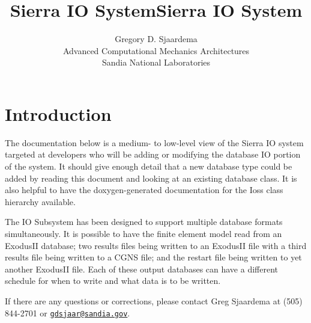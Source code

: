 \documentclass[11pt,twoside]{article}
\title{Sierra IO System}
\begin{document}
\clearpage\pagestyle{Standard}
\title{Sierra IO System}
\author{Gregory D. Sjaardema\\
	Advanced Computational Mechanics Architectures\\
	Sandia National Laboratories}

\maketitle

\setcounter{tocdepth}{3}
\setlength{\parskip}{0ex plus 0.5ex minus 0.2ex}
\tableofcontents

\section{Introduction}
The documentation below is a medium{}- to low{}-level view of the Sierra
IO system targeted at developers who will be adding or modifying the
database IO portion of the system. It should give enough detail that a
new database type could be added by reading this document and looking
at an existing database class. It is also helpful to have the
doxygen{}-generated documentation for the Ioss class hierarchy
available.

The IO Subsystem has been designed to support multiple database formats
simultaneously. It is possible to have the finite element model read
from an ExodusII database; two results files being written to an
ExodusII file with a third results file being written to a CGNS file;
and the restart file being written to yet another ExodusII file. Each of
these output databases can have a different schedule for when to write
and what data is to be written.

If there are any questions or corrections, please contact Greg Sjaardema
at (505) 844{}-2701 or \href{mailto:gdsjaar@sandia.gov}{\nolinkurl{gdsjaar@sandia.gov}}.

\setlength{\parskip}{1ex plus 0.5ex minus 0.2ex}
\end{document}
